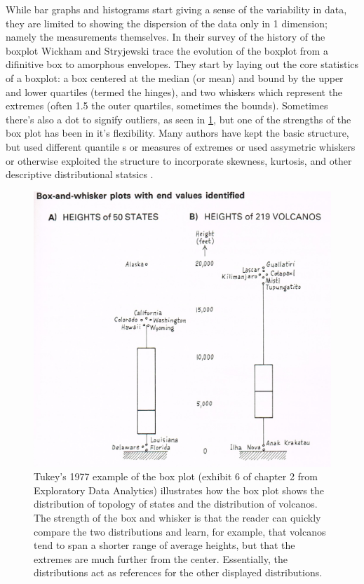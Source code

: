 While bar graphs and histograms start giving a sense of the variability in
data, they are limited to showing the dispersion of the data only in 1
dimension; namely the measurements themselves. In their survey of the history
of the boxplot \cite{wickham11} Wickham and Stryjewski trace the evolution of
the boxplot from a difinitive box to amorphous envelopes.  They start by laying out
the core statistics of a boxplot: a box centered at the median (or mean) and
bound by the upper and lower quartiles (termed the hinges), and two whiskers which represent the
extremes (often 1.5 the outer quartiles, sometimes the \alpha bounds). Sometimes there's
also a dot to signify outliers, as seen in \ref{fig:boxplot}, but one of
the strengths of the box plot has been in it's flexibility. Many authors have
kept the basic structure, but used different quantile \cite{Hyndman}s or
measures of extremes \cite{Frigge, carter} or used assymetric
whiskers \cite{Rousseuw} or otherwise exploited the structure to incorporate skewness, kurtosis, and
other descriptive distributional statsics \cite{ Aslam, choon, Marmelejo}. 

\begin{figure}
\includegraphics{figs/boxplot.png}
\caption{Tukey's 1977 example of the box plot (exhibit 6 of chapter 2 from
Exploratory Data Analytics\cite{tukey77e}) illustrates how the box plot shows the distribution of topology of states and
the distribution of volcanos. The strength of the box and whisker is that the
reader can quickly compare the two distributions and learn, for example, that
volcanos tend to span a shorter range of average heights, but that the extremes
are much further from the center. Essentially, the distributions act as
references for the other displayed distributions.}
\label{fig:boxplot}
\end{figure}

